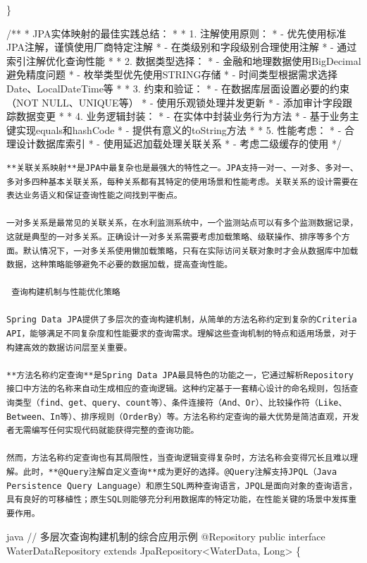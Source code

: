 \}

/** * JPA实体映射的最佳实践总结： * * 1. 注解使用原则： * - 优先使用标准JPA注解，谨慎使用厂商特定注解 * - 在类级别和字段级别合理使用注解 * - 通过索引注解优化查询性能 * * 2. 数据类型选择： * - 金融和地理数据使用BigDecimal避免精度问题 * - 枚举类型优先使用STRING存储 * - 时间类型根据需求选择Date、LocalDateTime等 * * 3. 约束和验证： * - 在数据库层面设置必要的约束（NOT NULL、UNIQUE等） * - 使用乐观锁处理并发更新 * - 添加审计字段跟踪数据变更 * * 4. 业务逻辑封装： * - 在实体中封装业务行为方法 * - 基于业务主键实现equals和hashCode * - 提供有意义的toString方法 * * 5. 性能考虑： * - 合理设计数据库索引 * - 使用延迟加载处理关联关系 * - 考虑二级缓存的使用 */

\begin{lstlisting}
**关联关系映射**是JPA中最复杂也是最强大的特性之一。JPA支持一对一、一对多、多对一、多对多四种基本关联关系，每种关系都有其特定的使用场景和性能考虑。关联关系的设计需要在表达业务语义和保证查询性能之间找到平衡点。

一对多关系是最常见的关联关系，在水利监测系统中，一个监测站点可以有多个监测数据记录，这就是典型的一对多关系。正确设计一对多关系需要考虑加载策略、级联操作、排序等多个方面。默认情况下，一对多关系使用懒加载策略，只有在实际访问关联对象时才会从数据库中加载数据，这种策略能够避免不必要的数据加载，提高查询性能。

 查询构建机制与性能优化策略

Spring Data JPA提供了多层次的查询构建机制，从简单的方法名称约定到复杂的Criteria API，能够满足不同复杂度和性能要求的查询需求。理解这些查询机制的特点和适用场景，对于构建高效的数据访问层至关重要。

**方法名称约定查询**是Spring Data JPA最具特色的功能之一，它通过解析Repository接口中方法的名称来自动生成相应的查询逻辑。这种约定基于一套精心设计的命名规则，包括查询类型（find、get、query、count等）、条件连接符（And、Or）、比较操作符（Like、Between、In等）、排序规则（OrderBy）等。方法名称约定查询的最大优势是简洁直观，开发者无需编写任何实现代码就能获得完整的查询功能。

然而，方法名称约定查询也有其局限性，当查询逻辑变得复杂时，方法名称会变得冗长且难以理解。此时，**@Query注解自定义查询**成为更好的选择。@Query注解支持JPQL（Java Persistence Query Language）和原生SQL两种查询语言，JPQL是面向对象的查询语言，具有良好的可移植性；原生SQL则能够充分利用数据库的特定功能，在性能关键的场景中发挥重要作用。
\end{lstlisting}

java // 多层次查询构建机制的综合应用示例 @Repository public interface WaterDataRepository extends JpaRepository\textless WaterData, Long\textgreater{} \{

